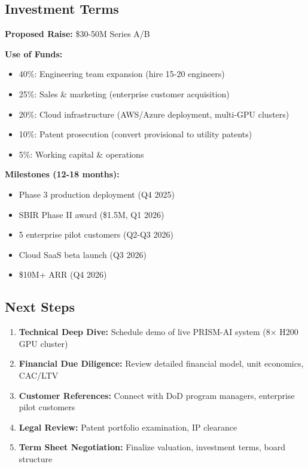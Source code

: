 \documentclass[11pt,letterpaper]{article}
\begin{document}
\subsection{Investment Terms}

\textbf{Proposed Raise:} \$30-50M Series A/B

\textbf{Use of Funds:}
\begin{itemize}
    \item 40\%: Engineering team expansion (hire 15-20 engineers)
    \item 25\%: Sales \& marketing (enterprise customer acquisition)
    \item 20\%: Cloud infrastructure (AWS/Azure deployment, multi-GPU clusters)
    \item 10\%: Patent prosecution (convert provisional to utility patents)
    \item 5\%: Working capital \& operations
\end{itemize}

\textbf{Milestones (12-18 months):}
\begin{itemize}
    \item Phase 3 production deployment (Q4 2025)
    \item SBIR Phase II award (\$1.5M, Q1 2026)
    \item 5 enterprise pilot customers (Q2-Q3 2026)
    \item Cloud SaaS beta launch (Q3 2026)
    \item \$10M+ ARR (Q4 2026)
\end{itemize}

\subsection{Next Steps}

\begin{enumerate}
    \item \textbf{Technical Deep Dive:} Schedule demo of live PRISM-AI system (8× H200 GPU cluster)
    \item \textbf{Financial Due Diligence:} Review detailed financial model, unit economics, CAC/LTV
    \item \textbf{Customer References:} Connect with DoD program managers, enterprise pilot customers
    \item \textbf{Legal Review:} Patent portfolio examination, IP clearance
    \item \textbf{Term Sheet Negotiation:} Finalize valuation, investment terms, board structure
\end{enumerate}
\end{document}
